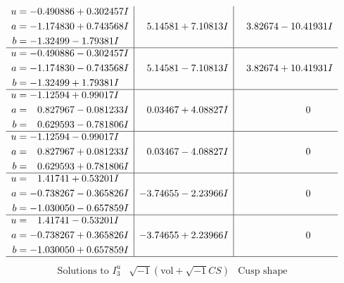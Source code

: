 \documentclass[1p]{elsarticle_modified}
\theoremstyle{definition}
\newcommand{\I}{\sqrt{-1}}
\begin{document}
$$\begin{array}{c|c|c}
\begin{aligned}
u &= -0.490886 + 0.302457 I \\
a &= -1.174830 + 0.743568 I \\
b &= -1.32499 - 1.79381 I\end{aligned}
 & \phantom{-}5.14581 + 7.10813 I & \phantom{-}3.82674 - 10.41931 I \\ \hline\begin{aligned}
u &= -0.490886 - 0.302457 I \\
a &= -1.174830 - 0.743568 I \\
b &= -1.32499 + 1.79381 I\end{aligned}
 & \phantom{-}5.14581 - 7.10813 I & \phantom{-}3.82674 + 10.41931 I \\ \hline\begin{aligned}
u &= -1.12594 + 0.99017 I \\
a &= \phantom{-}0.827967 - 0.081233 I \\
b &= \phantom{-}0.629593 - 0.781806 I\end{aligned}
 & \phantom{-}0.03467 + 4.08827 I & \phantom{-0.000000 } 0 \\ \hline\begin{aligned}
u &= -1.12594 - 0.99017 I \\
a &= \phantom{-}0.827967 + 0.081233 I \\
b &= \phantom{-}0.629593 + 0.781806 I\end{aligned}
 & \phantom{-}0.03467 - 4.08827 I & \phantom{-0.000000 } 0 \\ \hline\begin{aligned}
u &= \phantom{-}1.41741 + 0.53201 I \\
a &= -0.738267 - 0.365826 I \\
b &= -1.030050 - 0.657859 I\end{aligned}
 & -3.74655 - 2.23966 I & \phantom{-0.000000 } 0 \\ \hline\begin{aligned}
u &= \phantom{-}1.41741 - 0.53201 I \\
a &= -0.738267 + 0.365826 I \\
b &= -1.030050 + 0.657859 I\end{aligned}
 & -3.74655 + 2.23966 I & \phantom{-0.000000 } 0\\
 \hline 
 \end{array}$$\newpage$$\begin{array}{c|c|c}  
\text{Solutions to }I^u_{3}& \I (\text{vol} + \sqrt{-1}CS) & \text{Cusp shape}\\
 \hline 
\begin{aligned}

\end{aligned}
\end{array}$$
\end{document}

